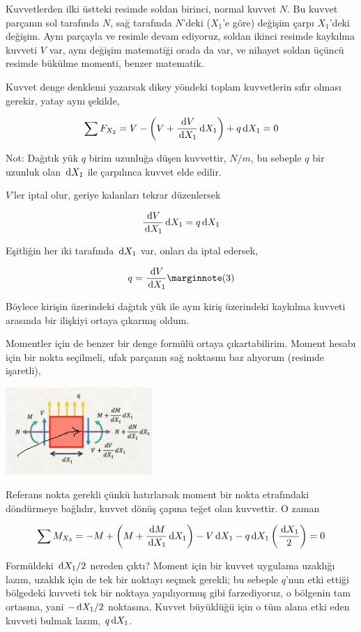 \documentclass[12pt,fleqn]{article}\usepackage{../../common}
\begin{document}
Kuvvetlerden ilki üstteki resimde soldan birinci, normal kuvvet $N$. Bu kuvvet
parçanın sol tarafında $N$, sağ tarafında $N$'deki ($X_1$'e göre) değişim çarpı
$X_1$'deki değişim. Aynı parçayla ve resimle devam ediyoruz, soldan ikinci
resimde kaykılma kuvveti $V$ var, aynı değişim matematiği orada da var, ve
nihayet soldan üçüncü resimde bükülme momenti, benzer matematik.

Kuvvet denge denklemi yazarsak dikey yöndeki toplam kuvvetlerin sıfır olması
gerekir, yatay aynı şekilde,

$$
\sum F_{X_2} = V - \left( V + \frac{\,\mathrm{d} V}{\,\mathrm{d} X_1} \,\mathrm{d} X_1 \right) + q \,\mathrm{d} X_1 = 0
$$

Not: Dağıtık yük $q$ birim uzunluğa düşen kuvvettir, $N/m$, bu sebeple $q$ bir
uzunluk olan $\,\mathrm{d} X_1$ ile çarpılınca kuvvet elde edilir.

$V$'ler iptal olur, geriye kalanları tekrar düzenlersek

$$
\frac{\,\mathrm{d} V}{\,\mathrm{d} X_1} \,\mathrm{d} X_1 = q \,\mathrm{d} X_1 
$$

Eşitliğin her iki tarafında $\,\mathrm{d} X_1$ var, onları da iptal edersek,

$$
q = \frac{\ud V}{\ud X_1}
\mlabel{3}
$$

Böylece kirişin üzerindeki dağıtık yük ile aynı kiriş üzerindeki kaykılma
kuvveti arasında bir ilişkiyi ortaya çıkarmış oldum. 

Momentler için de benzer bir denge formülü ortaya çıkartabilirim. Moment hesabı
için bir nokta seçilmeli, ufak parçanın sağ noktasını baz alıyorum (resimde
işaretli),

\includegraphics[width=15em]{phy_020_strs_02_11.jpg}

Referans nokta gerekli çünkü hatırlarsak moment bir nokta etrafındaki
döndürmeye bağlıdır, kuvvet dönüş çapına teğet olan kuvvettir. O zaman 

$$
\sum M_{X_3} = -M + \left( M + \frac{\,\mathrm{d} M}{\,\mathrm{d} X_1} \,\mathrm{d} X_1 \right) -
V \,\mathrm{d} X_1 - q \,\mathrm{d} X_1 \left( \frac{\,\mathrm{d} X_1}{2}  \right) = 0
$$

Formüldeki $\,\mathrm{d} X_1 / 2$ nereden çıktı? Moment için bir kuvvet uygulama uzaklığı
lazım, uzaklık için de tek bir noktayı seçmek gerekli; bu sebeple $q$'nun etki
ettiği bölgedeki kuvveti tek bir noktaya yapılıyormuş gibi farzediyoruz, o
bölgenin tam ortasına, yani $- \,\mathrm{d} X_1 / 2$ noktasına.  Kuvvet büyüklüğü için o
tüm alana etki eden kuvveti bulmak lazım, $q \,\mathrm{d} X_1$.
\end{document}
